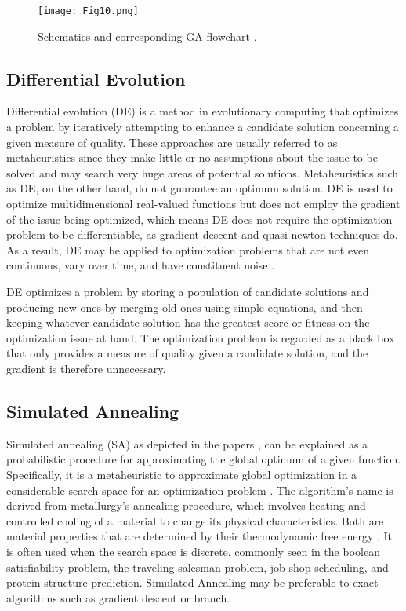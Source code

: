 \documentclass[default,iicol]{sn-jnl}
\theoremstyle{thmstyleone}
\theoremstyle{thmstyletwo}
\theoremstyle{thmstylethree}
\begin{document}
\begin{figure}[ht]
\centering
\texttt{[image: Fig10.png]}
\caption{Schematics and corresponding GA flowchart \cite{bib20}.}\label{fig10}
\end{figure}

\subsection{Differential Evolution}\label{subsec10}
Differential evolution (DE) \cite{bib21} is a method in evolutionary computing that optimizes a problem by iteratively attempting to enhance a candidate solution concerning a given measure of quality. These approaches are usually referred to as metaheuristics since they make little or no assumptions about the issue to be solved and may search very huge areas of potential solutions. Metaheuristics such as DE, on the other hand, do not guarantee an optimum solution. DE is used to optimize multidimensional real-valued functions but does not employ the gradient of the issue being optimized, which means DE does not require the optimization problem to be differentiable, as gradient descent and quasi-newton techniques do. As a result, DE may be applied to optimization problems that are not even continuous, vary over time, and have constituent noise \cite{bib22}.

DE optimizes a problem by storing a population of candidate solutions and producing new ones by merging old ones using simple equations, and then keeping whatever candidate solution has the greatest score or fitness on the optimization issue at hand. The optimization problem is regarded as a black box that only provides a measure of quality given a candidate solution, and the gradient is therefore unnecessary.

\subsection{Simulated Annealing}\label{subsec11}

Simulated annealing (SA) as depicted in the papers \cite{bib23}, \cite{bib45} can be explained as a probabilistic procedure for approximating the global optimum of a given function. Specifically, it is a metaheuristic to approximate global optimization in a considerable search space for an optimization problem \cite{bib44}. The algorithm's name is derived from metallurgy's annealing procedure, which involves heating and controlled cooling of a material to change its physical characteristics. Both are material properties that are determined by their thermodynamic free energy \cite{bib24}. It is often used when the search space is discrete, commonly seen in the boolean satisfiability problem, the traveling salesman problem, job-shop scheduling, and protein structure prediction. Simulated Annealing may be preferable to exact algorithms such as gradient descent or branch.
 
\end{document}
